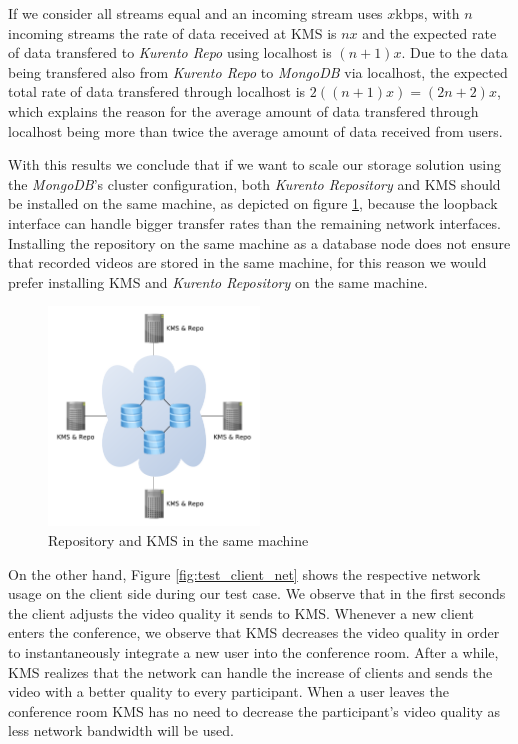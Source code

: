 If we consider all streams equal and an incoming stream uses $x$kbps, with $n$ incoming streams the rate of data received at \ac{KMS} is $nx$ and the expected rate of data transfered to \emph{Kurento Repo} using localhost is $(n+1)x$. Due to the data being transfered also from \emph{Kurento Repo} to \emph{MongoDB} via localhost, the expected total rate of data transfered through localhost is $2((n+1)x) = (2n+2)x$, which explains the reason for the average amount of data transfered through localhost being more than twice the average amount of data received from users.

With this results we conclude that if we want to scale our storage solution using the \emph{MongoDB}'s cluster configuration, both \emph{Kurento Repository} and \ac{KMS} should be installed on the same machine, as depicted on figure \ref{fig:scale2}, because the loopback interface can handle bigger transfer rates than the remaining network interfaces. Installing the repository on the same machine as a database node does not ensure that recorded videos are stored in the same machine, for this reason we would prefer installing \ac{KMS} and \emph{Kurento Repository} on the same machine.

\begin{figure}
  \centering
  \includegraphics[width=0.5\textwidth]{figures/scale2.pdf}
  \caption{Repository and KMS in the same machine}
  \label{fig:scale2}
\end{figure}



On the other hand, Figure \ref{fig:test_client_net} shows the respective network usage on the client side during our test case. We observe that in the first seconds the client adjusts the video quality it sends to \ac{KMS}. Whenever a new client enters the conference, we observe that \ac{KMS} decreases the video quality in order to instantaneously integrate a new user into the conference room. After a while, \ac{KMS} realizes that the network can handle the increase of clients and sends the video with a better quality to every participant. When a user leaves the conference room \ac{KMS} has no need to decrease the participant's video quality as less network bandwidth will be used.

